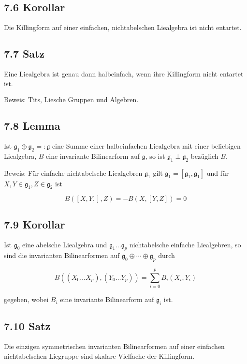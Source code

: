 \documentclass[10pt, letterpaper]{article}
\begin{document}
\subsection*{7.6 Korollar}
Die Killingform auf einer einfachen, nichtabelschen Liealgebra ist nicht entartet.

\subsection*{7.7 Satz}
Eine Liealgebra ist genau dann halbeinfach, wenn ihre Killingform nicht entartet ist.

Beweis: Tits, Liesche Gruppen und Algebren.

\subsection*{7.8 Lemma}
Ist $\mathfrak{g}_{1} \oplus \mathfrak{g}_{2}=: \mathfrak{g}$ eine Summe einer halbeinfachen Liealgebra mit einer beliebigen Liealgebra, $B$ eine invariante Bilinearform auf $\mathfrak{g}$, so ist $\mathfrak{g}_{1} \perp \mathfrak{g}_{2}$ bezüglich $B$.

Beweis: Für einfache nichtabelsche Liealgebren $\mathfrak{g}_{1}$ gilt $\mathfrak{g}_{1}=\left[\mathfrak{g}_{1}, \mathfrak{g}_{1}\right]$ und für $X, Y \in \mathfrak{g}_{1}, Z \in \mathfrak{g}_{2}$ ist

$$
B([X, Y,], Z)=-B(X,[Y, Z])=0
$$

\subsection*{7.9 Korollar}
Ist $\mathfrak{g}_{0}$ eine abelsche Liealgebra und $\mathfrak{g}_{1} \ldots \mathfrak{g}_{p}$ nichtabelsche einfache Liealgebren, so sind die invarianten Bilinearformen auf $\mathfrak{g}_{0} \oplus \cdots \oplus \mathfrak{g}_{p}$ durch

$$
B\left(\left(X_{0} \ldots X_{p}\right),\left(Y_{0} \ldots Y_{p}\right)\right)=\sum_{i=0}^{p} B_{i}\left(X_{i}, Y_{i}\right)
$$

gegeben, wobei $B_{i}$ eine invariante Bilinearform auf $\mathfrak{g}_{i}$ ist.

\subsection*{7.10 Satz}
Die einzigen symmetrischen invarianten Bilinearformen auf einer einfachen nichtabelschen Liegruppe sind skalare Vielfache der Killingform.
\end{document}
